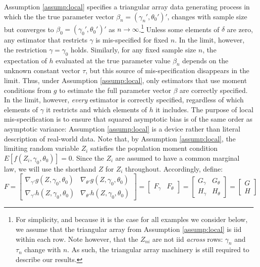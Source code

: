 Assumption \ref{assump:local} specifies a triangular array data generating process in which the the true parameter vector $\beta_n = \left(\gamma_n', \theta_0' \right)'$, changes with sample size but converges to $\beta_0 = \left(\gamma_0', \theta_0'\right)'$ as $n\rightarrow \infty$.\footnote{For simplicity, and because it is the case for all examples we consider below, we assume that the triangular array from Assumption \ref{assump:local} is iid within each row. Note however, that the $Z_{ni}$ are not iid \emph{across} rows: $\gamma_n$ and $\tau_n$ change with $n$. As such, the triangular array machinery is still required to describe our results.}
Unless some elements of $\delta$ are zero, any estimator that restricts $\gamma$ is mis-specified for fixed $n$. 
In the limit, however, the restriction $\gamma = \gamma_0$ holds. 
Similarly, for any fixed sample size $n$, the expectation of $h$ evaluated at the true parameter value $\beta_n$ depends on the unknown constant vector $\tau$, but this source of mis-specification disappears in the limit. 
Thus, under Assumption \ref{assump:local}, only estimators that use moment conditions from $g$ to estimate the full parameter vector $\beta$ are correctly specified. 
In the limit, however, \emph{every} estimator is correctly specified, regardless of which elements of $\gamma$ it restricts and which elements of $h$ it includes. 
The purpose of local mis-specification is to ensure that squared asymptotic bias is of the same order as asymptotic variance: Assumption \ref{assump:local} is a device rather than literal description of real-world data. 
Note that, by Assumption \ref{assump:local}, the limiting random variable $Z_i$ satisfies the population moment condition $E[f\left(Z_i,\gamma_0, \theta_0\right)]=0$. 
Since the $Z_i$ are assumed to have a common marginal law, we will use the shorthand $Z$ for $Z_i$ throughout.
Accordingly, define:
		\begin{equation}F  =  \left[\begin{array}{cc}  \nabla_{\gamma'}g\left(Z,\gamma_0, \theta_0\right) &   \nabla_{\theta'}g\left(Z,\gamma_0, \theta_0\right) \\
 \nabla_{\gamma'}h\left(Z,\gamma_0, \theta_0\right)  &   \nabla_{\theta'}h\left(Z,\gamma_0, \theta_0\right)  
		 \end{array}\right] = \left[\begin{array}{cc}F_\gamma & F_\theta \end{array}\right] = 
		  \left[\begin{array}{cc} G_\gamma & G_\theta \\
					 H_\gamma& H_\theta
		 \end{array}\right] = \left[\begin{array}{c} G\\ H \end{array}\right]
	\end{equation}
